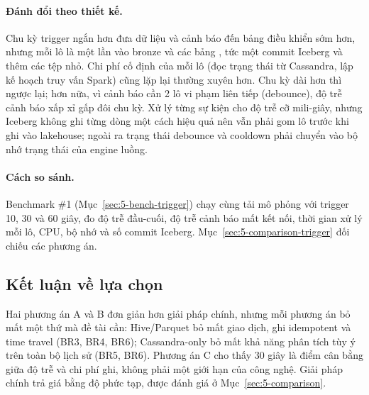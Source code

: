 \paragraph{Đánh đổi theo thiết kế.} Chu kỳ trigger ngắn hơn đưa dữ liệu và cảnh báo đến bảng điều khiển sớm hơn, nhưng mỗi lô là một lần  vào bronze và các bảng , tức một commit Iceberg và thêm các tệp nhỏ. Chi phí cố định của mỗi lô (đọc trạng thái từ Cassandra, lập kế hoạch truy vấn Spark) cũng lặp lại thường xuyên hơn. Chu kỳ dài hơn thì ngược lại; hơn nữa, vì cảnh báo cần 2 lô vi phạm liên tiếp (debounce), độ trễ cảnh báo xấp xỉ gấp đôi chu kỳ. Xử lý từng sự kiện cho độ trễ cỡ mili-giây, nhưng Iceberg không ghi từng dòng một cách hiệu quả nên vẫn phải gom lô trước khi ghi vào lakehouse; ngoài ra trạng thái debounce và cooldown phải chuyển vào bộ nhớ trạng thái của engine luồng.

\paragraph{Cách so sánh.} Benchmark \#1 (Mục~\ref{sec:5-bench-trigger}) chạy cùng tải mô phỏng với trigger 10, 30 và 60 giây, đo độ trễ đầu-cuối, độ trễ cảnh báo mất kết nối, thời gian xử lý mỗi lô, CPU, bộ nhớ và số commit Iceberg. Mục~\ref{sec:5-comparison-trigger} đối chiếu các phương án.

\subsection{Kết luận về lựa chọn}
\label{sec:4-alt-conclusion}

Hai phương án A và B đơn giản hơn giải pháp chính, nhưng mỗi phương án bỏ mất một thứ mà đề tài cần: Hive/Parquet bỏ mất giao dịch, ghi idempotent và time travel (BR3, BR4, BR6); Cassandra-only bỏ mất khả năng phân tích tùy ý trên toàn bộ lịch sử (BR5, BR6). Phương án C cho thấy 30 giây là điểm cân bằng giữa độ trễ và chi phí ghi, không phải một giới hạn của công nghệ. Giải pháp chính trả giá bằng độ phức tạp, được đánh giá ở Mục~\ref{sec:5-comparison}.
